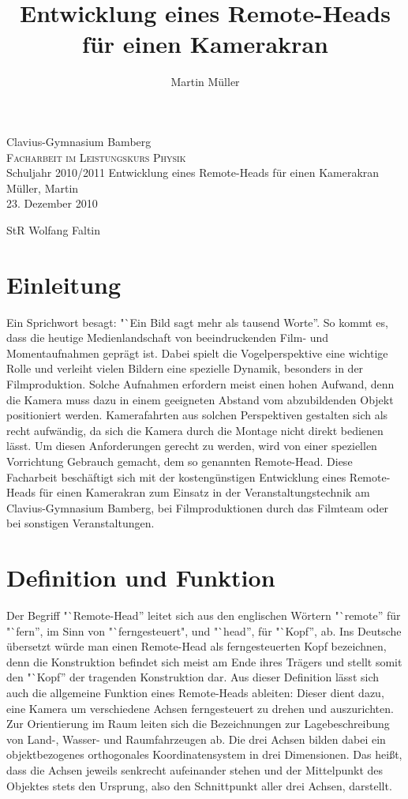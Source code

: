 \documentclass[a4paper, 12pt, bibliography=totocnumbered, listof=numbered]{scrartcl}
\begin{document}
	\title{Entwicklung eines Remote-Heads für einen Kamerakran}
	\author{Martin Müller}

	\thispagestyle{empty}
	\begin{center}
		\large{Clavius-Gymnasium Bamberg}\\
		\Large\textsc{Facharbeit im Leistungskurs Physik}\\
		\large{Schuljahr 2010/2011}
		\vfill
		{\Huge Entwicklung eines Remote-Heads für einen Kamerakran}
		\vfill
		\hfill{Müller, Martin}\\
		\hfill\small{23. Dezember 2010}\\
	\end{center}
	StR Wolfang Faltin

	\pagebreak

	\thispagestyle{empty}
	\tableofcontents

	\pagebreak

	\section{Einleitung}
	Ein Sprichwort besagt: "`Ein Bild sagt mehr als tausend Worte”. So kommt es, dass die heutige Medienlandschaft von beeindruckenden Film- und Momentaufnahmen geprägt ist. Dabei spielt die Vogelperspektive eine wichtige Rolle und verleiht vielen Bildern eine spezielle Dynamik, besonders in der Filmproduktion. Solche Aufnahmen erfordern meist einen hohen Aufwand, denn die Kamera muss dazu in einem geeigneten Abstand vom abzubildenden Objekt positioniert werden. Kamerafahrten aus solchen Perspektiven gestalten sich als recht aufwändig, da sich die Kamera durch die Montage nicht direkt bedienen lässt. Um diesen Anforderungen gerecht zu werden, wird von einer speziellen Vorrichtung Gebrauch gemacht, dem so genannten Remote-Head.
	Diese Facharbeit beschäftigt sich mit der kostengünstigen Entwicklung eines Remote-Heads für einen Kamerakran zum Einsatz in der Veranstaltungstechnik am Clavius-Gymnasium Bamberg, bei Filmproduktionen durch das Filmteam oder bei sonstigen Veranstaltungen.

	\section{Definition und Funktion}
	Der Begriff "`Remote-Head” leitet sich aus den englischen Wörtern "`remote” für "`fern”, im Sinn von "`ferngesteuert", und "`head”, für "`Kopf”, ab. Ins Deutsche übersetzt würde man einen Remote-Head als ferngesteuerten Kopf bezeichnen, denn die Konstruktion befindet sich meist am Ende ihres Trägers und stellt somit den "`Kopf” der tragenden Konstruktion dar.
	Aus dieser Definition lässt sich auch die allgemeine Funktion eines Remote-Heads ableiten: Dieser dient dazu, eine Kamera um verschiedene Achsen ferngesteuert zu drehen und auszurichten. Zur Orientierung im Raum leiten sich die Bezeichnungen zur Lagebeschreibung von Land-, Wasser- und Raumfahrzeugen ab. Die drei Achsen bilden dabei ein objektbezogenes orthogonales Koordinatensystem in drei Dimensionen. Das heißt, dass die Achsen jeweils senkrecht aufeinander stehen und der Mittelpunkt des Objektes stets den Ursprung, also den Schnittpunkt aller drei Achsen, darstellt.
\end{document}
